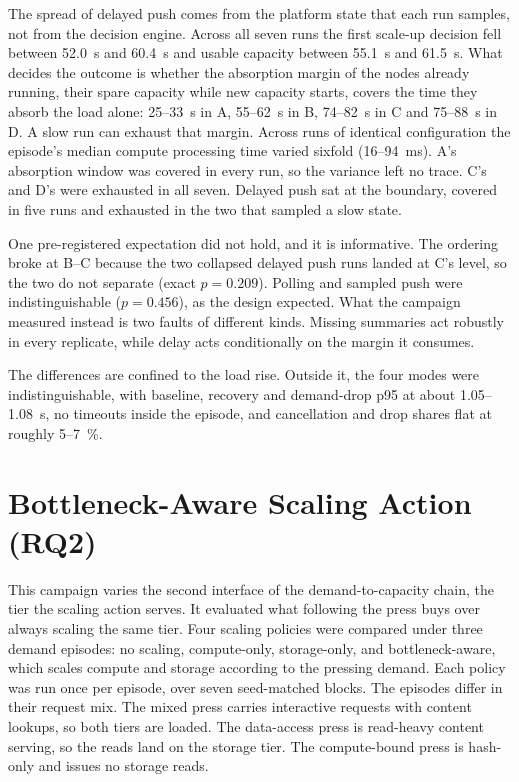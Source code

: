 ﻿\documentclass[12pt,reqno,twoside]{amsbook}
\begin{document}
The spread of delayed push comes from the platform state that each run
samples, not from the decision engine. Across all seven runs
the first scale-up decision fell between 52.0~s and 60.4~s and usable
capacity between 55.1~s and 61.5~s. What decides the outcome is whether the
absorption margin of the nodes already running, their spare capacity while new
capacity starts, covers the time they absorb the load alone: 25--33~s in A,
55--62~s in B,
74--82~s in C and 75--88~s in D. A slow run can exhaust that margin. Across runs
of identical configuration the episode's median compute processing time 
varied sixfold (16--94~ms). A's absorption window was covered in every run,
so the variance left no trace. C's and D's were exhausted in all seven.
Delayed push sat at the boundary, covered in five runs and exhausted in the
two that sampled a slow state.

One pre-registered expectation did not hold, and it is informative. The
ordering broke at B--C because the two collapsed delayed push runs landed at
C's level, so the two do not separate (exact $p = 0.209$). Polling and sampled
push were indistinguishable ($p = 0.456$), as the design expected. What the campaign
measured instead is two faults of different kinds. Missing summaries act
robustly in every replicate, while delay acts conditionally on the margin it
consumes.

The differences are confined to the load rise. Outside it, the four
modes were indistinguishable, with baseline, recovery and demand-drop p95 at
about 1.05--1.08~s, no timeouts inside the episode, and cancellation and
drop shares flat at roughly 5--7~\%.

\section{Bottleneck-Aware Scaling Action (RQ2)}\label{sec:results_rq2_action}

This campaign varies the second interface of the demand-to-capacity chain, the
tier the scaling action serves. It evaluated what following the press buys over
always scaling the same tier. Four scaling policies were compared under three
demand episodes:
no scaling, compute-only, storage-only, and bottleneck-aware, which scales
compute and storage according to the pressing demand. Each
policy was run once per episode, over seven seed-matched blocks. The
episodes differ in their request mix. The mixed press carries
interactive requests with content lookups, so both tiers are loaded. The
data-access press is read-heavy content serving, so the reads land on the
storage tier. The compute-bound press is hash-only and issues no storage
reads.
\end{document}

